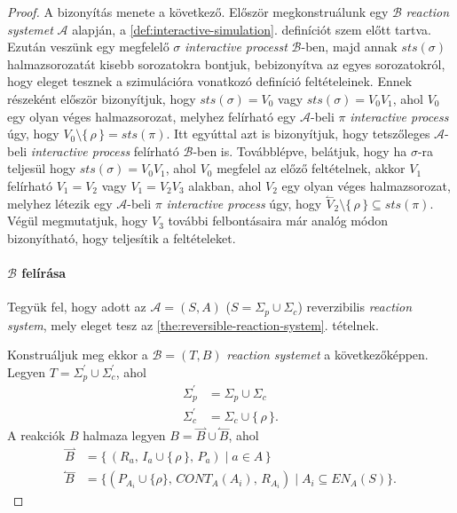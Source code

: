 \documentclass[12pt]{article}
\theoremstyle{definition}
\theoremstyle{remark}
\theoremstyle{plain}
\theoremstyle{remark}
\theoremstyle{plain}
\newcommand{\forwardhat}{\overset{\rightharpoonup}}
\newcommand{\backwardhat}{\overset{\leftharpoonup}}
\newcommand{\reaction}[3]{
    (#1, \, #2, \, #3)
}
\begin{document}
    \begin{proof}
        A bizonyítás menete a következő. Először megkonstruálunk egy $\mathscr{B}$ \textit{reaction systemet} $\mathscr{A}$ alapján, a \ref{def:interactive-simulation}. definíciót szem előtt tartva. Ezután veszünk egy megfelelő $\sigma$ \textit{interactive processt} $\mathscr{B}$-ben, majd annak $\textit{sts}(\sigma)$ halmazsorozatát kisebb sorozatokra bontjuk, bebizonyítva az egyes sorozatokról, hogy eleget tesznek a szimulációra vonatkozó definíció feltételeinek. Ennek részeként először bizonyítjuk, hogy $\textit{sts}(\sigma)=V_{0}$ vagy $\textit{sts}(\sigma)=V_{0}V_{1}$, ahol $V_{0}$ egy olyan véges halmazsorozat, melyhez felírható egy $\mathscr{A}$-beli $\pi$ \textit{interactive process} úgy, hogy $V_{0} \setminus \{ \, \rho \, \} = \textit{sts}(\pi)$. Itt egyúttal azt is bizonyítjuk, hogy tetszőleges $\mathscr{A}$-beli \textit{interactive process} felírható $\mathscr{B}$-ben is. Továbblépve, belátjuk, hogy ha $\sigma$-ra teljesül hogy $\textit{sts}(\sigma)=V_{0}V_{1}$, ahol $V_{0}$ megfelel az előző feltételnek, akkor $V_{1}$ felírható $V_{1}=V_{2}$ vagy $V_{1}=V_{2}V_{3}$ alakban, ahol $V_{2}$ egy olyan véges halmazsorozat, melyhez létezik egy $\mathscr{A}$-beli $\pi$ \textit{interactive process} úgy, hogy $\backwardhat V_{2} \setminus \{ \,\rho\, \} \subseteq \textit{sts}(\pi)$. Végül megmutatjuk, hogy $V_{3}$ további felbontásaira már analóg módon bizonyítható, hogy teljesítik a feltételeket.

        \paragraph{$\mathscr{B}$ felírása}
        Tegyük fel, hogy adott az $\mathscr{A} = (S, A)$ ($S = \Sigma_{p} \cup \Sigma_{c}$) reverzibilis \textit{reaction system}, mely eleget tesz az \ref{the:reversible-reaction-system}. tételnek.
        
        Konstruáljuk meg ekkor a $\mathscr{B} = (T, B)$ \textit{reaction systemet} a következőképpen. Legyen $T = \Sigma_{p}^{\prime} \cup \Sigma^{\prime}_{c}$, ahol
        \begin{align*}
            \Sigma^{\prime}_{p} &= \Sigma_{p} \cup \Sigma_{c} \\
            \Sigma^{\prime}_{c} &= \Sigma_{c} \cup \{ \, \rho \, \}.
        \end{align*}
        A reakciók $B$ halmaza legyen $B = \forwardhat B \cup \backwardhat B$, ahol
        \begin{align*}
            \forwardhat B &= \{ \, \reaction{R_{a}}{I_{a} \cup \{ \, \rho \, \}}{P_{a}} \;|\; a \in A \, \} \\
            \backwardhat B &= \{ \reaction{P_{A_{i}} \cup \{ \rho \}}{CONT_{A}(A_{i})}{R_{A_{i}}} \;|\; A_{i} \subseteq \textit{EN}_{A}(S) \}.
        \end{align*}


\end{proof}
\end{document}

